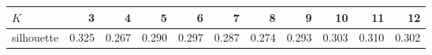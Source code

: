 \begin{tabular}{lrrrrrrrrrr}
\toprule
$K$ & 3 & 4 & 5 & 6 & 7 & 8 & 9 & 10 & 11 & 12 \\
\midrule
silhouette & 0.325 & 0.267 & 0.290 & 0.297 & 0.287 & 0.274 & 0.293 & 0.303 & 0.310 & 0.302 \\
\bottomrule
\end{tabular}
